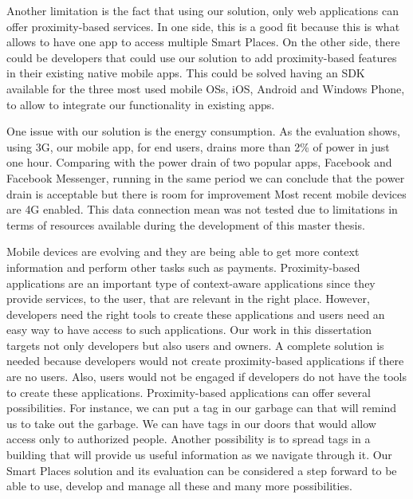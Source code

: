 Another limitation is the fact that using our solution, only web applications can offer proximity-based services.
In one side, this is a good fit because this is what allows to have one app to access multiple Smart Places.
On the other side, there could be developers that could use our solution to add proximity-based features in their existing native mobile apps.
This could be solved having an \gls{SDK} available for the three most used mobile \glspl{OS}, iOS, Android and Windows Phone, to allow to integrate our functionality in existing apps.

One issue with our solution is the energy consumption.
As the evaluation shows, using \gls{3G}, our mobile app, for end users, drains more than 2\% of power in just one hour.
Comparing with the power drain of two popular apps, Facebook and Facebook Messenger, running in the same period we can conclude that the power drain is acceptable but there is room for improvement
Most recent mobile devices are \gls{4G} enabled.
This data connection mean was not tested due to limitations in terms of resources available during the development of this master thesis.

Mobile devices are evolving and they are being able to get more context information and perform other tasks such as payments.
Proximity-based applications are an important type of context-aware applications since they provide services, to the user, that are relevant in the right place.
However, developers need the right tools to create these applications and users need an easy way to have access to such applications.
Our work in this dissertation targets not only developers but also users and owners.
A complete solution is needed because developers would not create proximity-based applications if there are no users.
Also, users would not be engaged if developers do not have the tools to create these applications.
Proximity-based applications can offer several possibilities.
For instance, we can put a tag in our garbage can that will remind us to take out the garbage.
We can have tags in our doors that would allow access only to authorized people.
Another possibility is to spread tags in a building that will provide us useful information as we navigate through it.
Our Smart Places solution and its evaluation can be considered a step forward to be able to use, develop and manage all these and many more possibilities.
